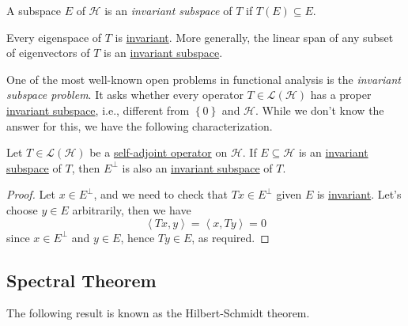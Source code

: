\begin{definition}\label{def:invariant-subspace}
	A subspace \(E\) of \(\mathcal{H} \) is an \emph{invariant subspace} of \(T\) if \(T(E) \subseteq E\).
\end{definition}

\begin{eg}
	Every eigenspace of \(T\) is \hyperref[def:invariant-subspace]{invariant}. More generally, the linear span of any subset of eigenvectors of \(T\) is an \hyperref[def:invariant-subspace]{invariant subspace}.
\end{eg}

One of the most well-known open problems in functional analysis is the \emph{invariant subspace problem}. It asks whether every operator \(T\in \mathcal{L} (\mathcal{H} )\) has a proper \hyperref[def:invariant-subspace]{invariant subspace}, i.e., different from \(\left\{ 0 \right\} \) and \(\mathcal{H} \). While we don't know the answer for this, we have the following characterization.

\begin{proposition}\label{prop:lec23}
	Let \(T\in \mathcal{L} (\mathcal{H} )\) be a \hyperref[def:self-adjoint-op]{self-adjoint operator} on \(\mathcal{H} \). If \(E \subseteq \mathcal{H} \) is an \hyperref[def:invariant-subspace]{invariant subspace} of \(T\), then \(E^{\perp} \) is also an \hyperref[def:invariant-subspace]{invariant subspace} of \(T\).
\end{proposition}
\begin{proof}
	Let \(x\in E^{\perp} \), and we need to check that \(Tx \in E ^{\perp} \) given \(E\) is \hyperref[def:invariant-subspace]{invariant}. Let's choose \(y\in E\) arbitrarily, then we have
	\[
		\left\langle Tx , y \right\rangle = \left\langle x, Ty \right\rangle = 0
	\]
	since \(x\in E^{\perp} \) and \(y\in E\), hence \(Ty\in E\), as required.
\end{proof}

\subsection{Spectral Theorem}
The following result is known as the Hilbert-Schmidt theorem.

